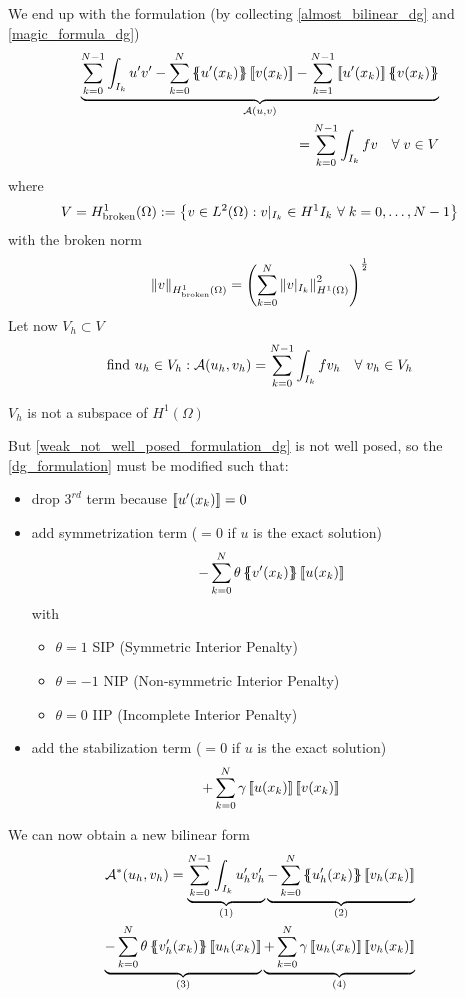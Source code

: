 We end up with the formulation (by collecting \eqref{almost_bilinear_dg} and \eqref{magic_formula_dg})
\begin{equation}
    \begin{split}
        \underbrace{\sum_{k=0}^{N-1}\int_{I_k} u'v' - \sum_{k=0}^{N} \average{u'(x_k)}\jump{v(x_k)} - \sum_{k=1}^{N-1} \jump{u'(x_k)}\average{v(x_k)}}_{\mathcal{A}(u,v)} \\
        = \sum_{k=0}^{N-1}\int_{I_k} fv \quad \forall \; v \in V \label{dg_formulation}
    \end{split}
\end{equation}
where 
\[
    V = H^1_{\text{broken}}(\Omega) := \left\{ v \in L^2(\Omega) : v\vert_{I_k} \in H^1{I_k} \ \forall \; k = 0,\ldots, N-1 \right\}
\]
with the broken norm 
\[
    \norm{v}_{H^1_{\text{broken}}(\Omega)} = \left( \sum_{k=0}^{N} \norm{v\vert_{I_k}}_{H^1(\Omega)}^2 \right)^{\frac{1}{2}}
\]
Let now \(V_h \subset V\)
\begin{equation}
    \text{find } u_h \in V_h : \mathcal{A}(u_h, v_h) = \sum_{k=0}^{N-1} \int_{I_k} fv_h \quad \forall \; v_h \in V_h \label{weak_not_well_posed_formulation_dg}
\end{equation}
\begin{remark}
    \(V_h\) is not a subspace of \(H^1(\Omega)\)
\end{remark}
But \eqref{weak_not_well_posed_formulation_dg} is not well posed, so the \eqref{dg_formulation} must be modified such that:
\begin{itemize}
    \item drop \(3^{rd}\) term because \(\left[\!\left[u'(x_k)\right]\!\right] = 0\)
    \item add symmetrization term (\(=0\) if \(u\) is the exact solution) 
    \[
        -\sum_{k=0}^{N} \theta \left\{\mspace{-6.5mu}\left\{v'(x_k)\right\}\mspace{-6.5mu}\right\}\left[\!\left[u(x_k)\right]\!\right]
    \]
    with
    \begin{itemize}
        \item[\qedhere] \(\theta = 1\) SIP (Symmetric Interior Penalty)
        \item[\qedhere] \(\theta = -1\) NIP (Non-symmetric Interior Penalty)
        \item[\qedhere] \(\theta = 0\) IIP (Incomplete Interior Penalty)
    \end{itemize}
    \item add the stabilization term (\(=0\) if \(u\) is the exact solution)
    \[
        +\sum_{k=0}^{N} \gamma \left[\!\left[u(x_k)\right]\!\right]\left[\!\left[v(x_k)\right]\!\right]
    \]
\end{itemize}
We can now obtain a new bilinear form
\begin{equation}
    \begin{split}
        \mathcal{A}^*(u_h, v_h) = \underbrace{\sum_{k=0}^{N-1} \int_{I_k} u'_h v'_h}_{(1)} \underbrace{-\sum_{k=0}^{N} \average{u'_h(x_k)} \jump{v_h(x_k)}}_{(2)} \\
        \underbrace{-\sum_{k=0}^{N} \theta \average{v'_h(x_k)} \jump{u_h(x_k)}}_{(3)} \underbrace{+\sum_{k=0}^{N} \gamma \jump{u_h(x_k)}\jump{v_h(x_k)}}_{(4)} \label{new_bilinear_form_dg} 
    \end{split}
\end{equation}
